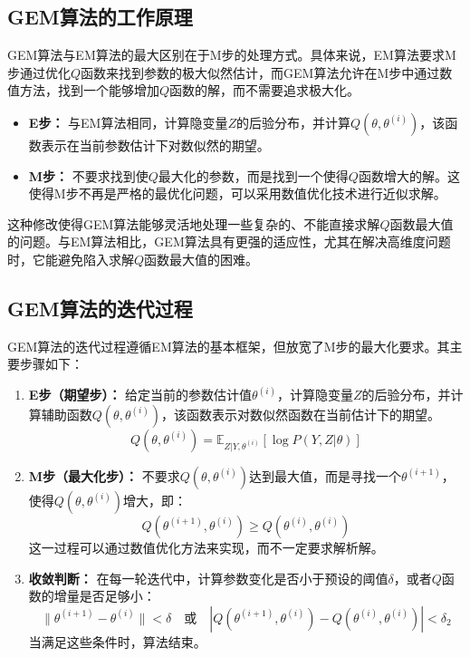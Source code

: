\documentclass[a4paper,12pt]{ctexart} %
\begin{document}
\subsection{GEM算法的工作原理}

GEM算法与EM算法的最大区别在于M步的处理方式。具体来说，EM算法要求M步通过优化$Q$函数来找到参数的极大似然估计，而GEM算法允许在M步中通过数值方法，找到一个能够增加$Q$函数的解，而不需要追求极大化。

\begin{itemize}
    \item \textbf{E步：} 与EM算法相同，计算隐变量$Z$的后验分布，并计算$Q(\theta, \theta^{(i)})$，该函数表示在当前参数估计下对数似然的期望。
    \item \textbf{M步：} 不要求找到使$Q$最大化的参数，而是找到一个使得$Q$函数增大的解。这使得M步不再是严格的最优化问题，可以采用数值优化技术进行近似求解。
\end{itemize}

这种修改使得GEM算法能够灵活地处理一些复杂的、不能直接求解$Q$函数最大值的问题。与EM算法相比，GEM算法具有更强的适应性，尤其在解决高维度问题时，它能避免陷入求解$Q$函数最大值的困难。

\subsection{GEM算法的迭代过程}

GEM算法的迭代过程遵循EM算法的基本框架，但放宽了M步的最大化要求。其主要步骤如下：

\begin{enumerate}
    \item \textbf{E步（期望步）：} 给定当前的参数估计值$\theta^{(i)}$，计算隐变量$Z$的后验分布，并计算辅助函数$Q(\theta, \theta^{(i)})$，该函数表示对数似然函数在当前估计下的期望。
    \begin{equation}
    Q(\theta, \theta^{(i)}) = \mathbb{E}_{Z|Y, \theta^{(i)}} [\log P(Y, Z | \theta)]
    \end{equation}
    
    \item \textbf{M步（最大化步）：} 不要求$Q(\theta, \theta^{(i)})$达到最大值，而是寻找一个$\theta^{(i+1)}$，使得$Q(\theta, \theta^{(i)})$增大，即：
    \begin{equation}
    Q(\theta^{(i+1)}, \theta^{(i)}) \geq Q(\theta^{(i)}, \theta^{(i)})
    \end{equation}
    这一过程可以通过数值优化方法来实现，而不一定要求解析解。
    
    \item \textbf{收敛判断：} 在每一轮迭代中，计算参数变化是否小于预设的阈值$\delta$，或者$Q$函数的增量是否足够小：
    \begin{equation}
    \|\theta^{(i+1)} - \theta^{(i)}\| < \delta
    \quad \text{或} \quad
    |Q(\theta^{(i+1)}, \theta^{(i)}) - Q(\theta^{(i)}, \theta^{(i)})| < \delta_2
    \end{equation}
    当满足这些条件时，算法结束。
\end{enumerate}
\end{document}
